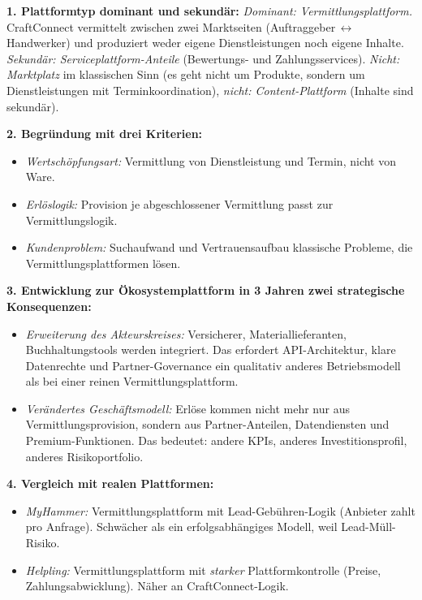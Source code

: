 \documentclass[11pt,a4paper,oneside]{article}
\begin{document}
\begin{loesungbox}
\textbf{1. Plattformtyp \textendash{} dominant und sekundär:}
\emph{Dominant: Vermittlungsplattform.} CraftConnect vermittelt zwischen zwei Marktseiten (Auftraggeber\,$\leftrightarrow$\,Handwerker) und produziert weder eigene Dienstleistungen noch eigene Inhalte. \emph{Sekundär: Serviceplattform-Anteile} (Bewertungs- und Zahlungsservices). \emph{Nicht: Marktplatz} im klassischen Sinn (es geht nicht um Produkte, sondern um Dienstleistungen mit Terminkoordination), \emph{nicht: Content-Plattform} (Inhalte sind sekundär).

\textbf{2. Begründung mit drei Kriterien:}
\begin{itemize}
  \item \emph{Wertschöpfungsart:} Vermittlung von Dienstleistung und Termin, nicht von Ware.
  \item \emph{Erlöslogik:} Provision je abgeschlossener Vermittlung passt zur Vermittlungslogik.
  \item \emph{Kundenproblem:} Suchaufwand und Vertrauensaufbau \textendash{} klassische Probleme, die Vermittlungsplattformen lösen.
\end{itemize}

\textbf{3. Entwicklung zur Ökosystemplattform in 3 Jahren \textendash{} zwei strategische Konsequenzen:}
\begin{itemize}
  \item \emph{Erweiterung des Akteurskreises:} Versicherer, Materiallieferanten, Buchhaltungstools werden integriert. Das erfordert API-Architektur, klare Datenrechte und Partner-Governance \textendash{} ein qualitativ anderes Betriebsmodell als bei einer reinen Vermittlungsplattform.
  \item \emph{Verändertes Geschäftsmodell:} Erlöse kommen nicht mehr nur aus Vermittlungsprovision, sondern aus Partner-Anteilen, Datendiensten und Premium-Funktionen. Das bedeutet: andere KPIs, anderes Investitionsprofil, anderes Risikoportfolio.
\end{itemize}

\textbf{4. Vergleich mit realen Plattformen:}
\begin{itemize}
  \item \emph{MyHammer:} Vermittlungsplattform mit Lead-Gebühren-Logik (Anbieter zahlt pro Anfrage). Schwächer als ein erfolgsabhängiges Modell, weil Lead-Müll-Risiko.
  \item \emph{Helpling:} Vermittlungsplattform mit \emph{starker} Plattformkontrolle (Preise, Zahlungsabwicklung). Näher an CraftConnect-Logik.
\end{itemize}
\end{loesungbox}
\end{document}
